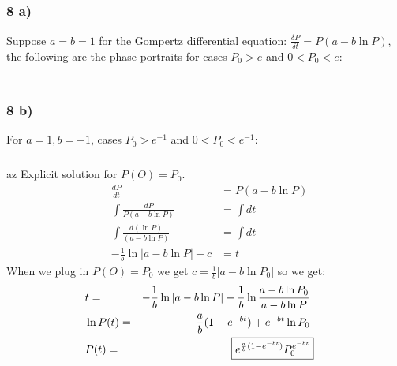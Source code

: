 \documentclass{article}
\begin{document}
\pagestyle{fancy}

\setcounter{section}{3}
\setcounter{subsection}{1}
\setcounter{subsubsection}{0}

\subsection{}
\subsubsection{8 a)}
Suppose $ a = b = 1 $ for the Gompertz differential equation: $\frac{\delta P}{\delta t} = P(a - b\ln P)$, the following are the phase portraits for cases $ P_0 > e$ and $ 0 < P_0 < e $:
\begin{align*}
    & \\
    & \\
    & \\
\end{align*}
\subsubsection*{8 b)}
For $ a = 1, b = -1 $,  cases $ P_0 > e^{-1}$ and $ 0 < P_0 < e^{-1} $:
\begin{align*}
    & \\
    & \\
    & \\
\end{align*}
az
Explicit solution for $ P(O) = P_0 $.
\begin{align*}
    & \frac{dP}{dt} &= P(a - b\ln P) \\
    & \int \frac{dP}{P(a - b\ln P)} & = \int dt \\
    & \int \frac{d(\ln P)}{(a - b \ln P)} &= \int dt \\
    & - \frac{1}{b} \ln |a - b \ln P| + c &= t
\end{align*}
When we plug in $ P(O) = P_0 $ we get $ c = \frac{1}{b}|a - b \ln P_0|$ so we get:
\begin{align*}
    & t = & - \frac{1}{b} \ln |a - b \ln P| + \frac{1}{b} \ln \frac{a - b \ln P_0}{a - b \ln P} \\
    & \ln P(t) = & \frac{a}{b} (1 - e^{-bt}) + e^{-bt} \ln P_0 \\
    &P(t) = & \Aboxed{e^{\frac{a}{b} (1 - e^{-bt})} P_0^{e^{-bt}}} 
\end{align*}
\end{document}
